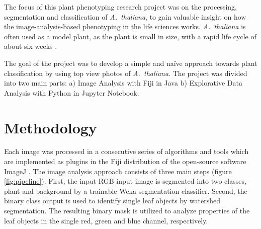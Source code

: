 \documentclass[paper=A4,bibliography=totocnumbered]{scrartcl}
\begin{document}
The focus of this plant phenotyping research project was on the processing, segmentation and classification of \textit{A.~thaliana}, to gain valuable insight on how the image-analysis-based phenotyping in the life sciences works. \textit{A.~thaliana} is often used as a model plant, as the plant is small in size, with a rapid life cycle of about six weeks \citep{Koornneef.2010}. 

The goal of the project was to develop a simple and naïve approach towards plant classification by using top view photos of  \textit{A.~thaliana}. The project was divided into two main parts:
a) Image Analysis with Fiji in Java
b) Explorative Data Analysis with Python in Jupyter Notebook.

\section{Methodology}
Each image was processed in a consecutive series of algorithms and tools which are implemented as plugins in the Fiji distribution \citep{Schindelin.2012} of the open-source software ImageJ \citep{Rueden.2017}. The image analysis approach consists of three main steps (figure \ref{fig:pipeline}). First, the input RGB input image is segmented into two classes, plant and background by a trainable Weka segmentation classifier. Second, the binary class output is used to identify single leaf objects by watershed segmentation. The resulting binary mask is utilized to analyze properties of the leaf objects in the single red, green and blue channel, respectively.
\end{document}
